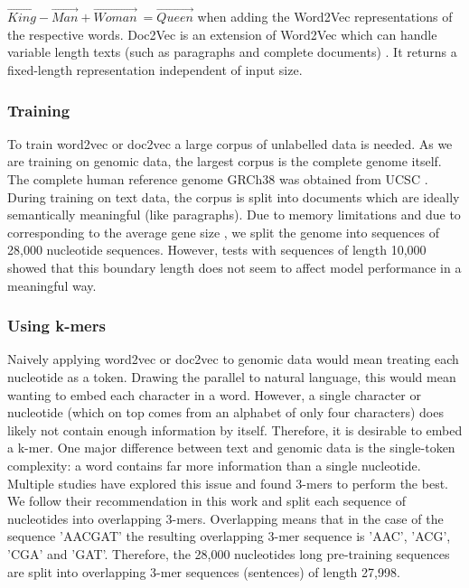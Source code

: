 
$\vec{King} - \vec{Man} + \vec{Woman} ~= \vec{Queen}$
when adding the Word2Vec representations of the respective words.
Doc2Vec is an extension of Word2Vec which can handle variable length texts (such as paragraphs and complete documents) \cite{d2v1} \cite{d2v2}. It returns a fixed-length representation independent of input size.

\subsubsection{Training}
To train word2vec or doc2vec a large corpus of unlabelled data is needed. As we are training on genomic data, the largest corpus is the complete genome itself. The complete human reference genome GRCh38 \cite{hg38} was obtained from UCSC \cite{ucsc}.\\ %
During training on text data, the corpus is split into documents which are ideally semantically meaningful (like paragraphs). Due to memory limitations and due to corresponding to the average gene size \cite{bionumbers}, we split the genome into sequences of 28,000 nucleotide sequences. However, tests with sequences of length 10,000 showed that this boundary length does not seem to affect model performance in a meaningful way.
\subsubsection{Using k-mers}\label{subsubsec:kmers}
Naively applying word2vec or doc2vec to genomic data would mean treating each nucleotide as a token. Drawing the parallel to natural language, this would mean wanting to embed each character in a word. However, a single character or nucleotide (which on top comes from an alphabet of only four characters) does likely not contain enough information by itself. Therefore, it is desirable to embed a k-mer.
One major difference between text and genomic data is the single-token complexity: a word contains far more information than a single nucleotide.
Multiple studies have explored this issue and found 3-mers to perform the best. %
 We follow their recommendation in this work and split each sequence of nucleotides into overlapping 3-mers. Overlapping means that in the case of the sequence 'AACGAT' the resulting overlapping 3-mer sequence is 'AAC', 'ACG', 'CGA' and 'GAT'. Therefore, the 28,000 nucleotides long pre-training sequences are split into overlapping 3-mer sequences (sentences) of length 27,998.
